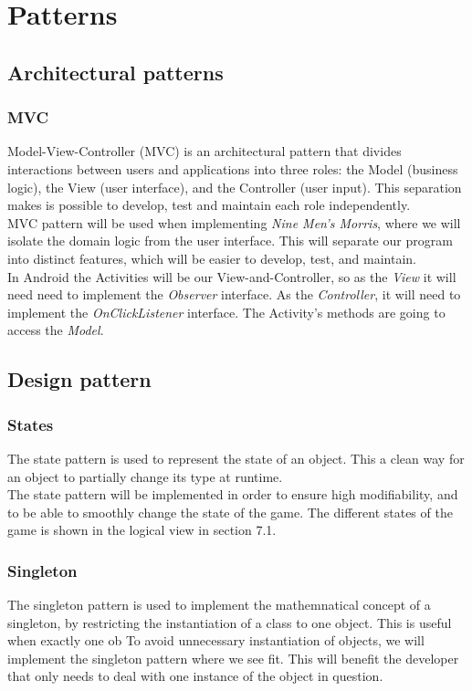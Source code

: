 \section{Patterns}

\subsection{Architectural patterns}

\subsubsection{MVC}
Model-View-Controller (MVC) is an architectural pattern that divides interactions between users and applications into three roles: the Model (business logic), the View (user interface), and the Controller (user input). This separation makes is possible to develop, test and maintain each role independently. \\

MVC pattern will be used when implementing \emph{Nine Men’s Morris}, where we will isolate the domain logic from the user interface. This will separate our program into distinct features, which will be easier to develop, test, and maintain. \\

In Android the Activities will be our View-and-Controller, so as the \emph{View} it will need need to implement the \emph{Observer} interface. As the \emph{Controller}, it will need to implement the \emph{OnClickListener} interface. The Activity’s methods are going to access the \emph{Model}.

\subsection{Design pattern}
\subsubsection{States}
The state pattern is used to represent the state of an object. This a clean way for an object to partially change its type at runtime. \\

The state pattern will be implemented in order to ensure high modifiability, and to be able to smoothly change the state of the game. The different states of the game is shown in the logical view in section 7.1.

\subsubsection{Singleton}
The singleton pattern is used to implement the mathemnatical concept of a singleton, by restricting the instantiation of a class to one object. This is useful when exactly one ob 
To avoid unnecessary instantiation of objects, we will implement the singleton pattern where we see fit. This will benefit the developer that only needs to deal with one instance of the object in question.




